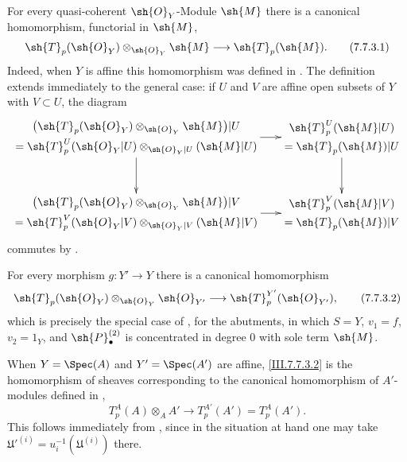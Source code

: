 \begin{env}[7.7.3]
\label{III.7.7.3}
For every quasi-coherent $\sh{O}_Y$-Module $\sh{M}$ there is
a canonical homomorphism, functorial in $\sh{M}$,
\[
  \sh{T}_p(\sh{O}_Y)
  \otimes_{\sh{O}_Y}\sh{M}
  \longrightarrow
  \sh{T}_p(\sh{M}).
  \tag{7.7.3.1}\label{III.7.7.3.1}
\]
Indeed, when $Y$ is affine this homomorphism was defined in
.  The definition extends immediately to
the general case: if $U$ and $V$ are affine open subsets of
$Y$ with $V\subset U$, the diagram
\[
\xymatrix@C=18pt@R=32pt{
  {\begin{gathered}
    \bigl(\sh{T}_p(\sh{O}_Y)
      \otimes_{\sh{O}_Y}\sh{M}\bigr)|U\\
    =
    \sh{T}^U_p(\sh{O}_Y|U)
      \otimes_{\sh{O}_Y|U}(\sh{M}|U)
  \end{gathered}}
  \ar[r]\ar[d]
  &
  {\begin{gathered}
    \sh{T}^U_p(\sh{M}|U)\\
    =\sh{T}_p(\sh{M})|U
  \end{gathered}}
  \ar[d]
  \\
  {\begin{gathered}
    \bigl(\sh{T}_p(\sh{O}_Y)
      \otimes_{\sh{O}_Y}\sh{M}\bigr)|V\\
    =
    \sh{T}^V_p(\sh{O}_Y|V)
      \otimes_{\sh{O}_Y|V}(\sh{M}|V)
  \end{gathered}}
  \ar[r]
  &
  {\begin{gathered}
    \sh{T}^V_p(\sh{M}|V)\\
    =\sh{T}_p(\sh{M})|V
  \end{gathered}}
}
\]
commutes by .

For every morphism $g:Y'\to Y$ there is a canonical
homomorphism
\[
  \sh{T}_p(\sh{O}_Y)
  \otimes_{\sh{O}_Y}\sh{O}_{Y'}
  \longrightarrow
  \sh{T}^{Y'}_p(\sh{O}_{Y'}),
  \tag{7.7.3.2}\label{III.7.7.3.2}
\]
which is precisely the special case of
, for the abutments, in which
$S=Y$, $v_1=f$, $v_2=1_Y$, and
$\sh{P}^{(2)}_\bullet$ is concentrated in degree $0$ with
sole term $\sh{M}$.

When $Y=\Spec(A)$ and $Y'=\Spec(A')$ are affine,
\eqref{III.7.7.3.2} is the homomorphism of sheaves
corresponding to the canonical homomorphism of $A'$-modules
defined in ,
\[
  T^A_p(A)\otimes_A A'
  \longrightarrow
  T^{A'}_p(A')
  =
  T^A_p(A').
\]
This follows immediately from , since in
the situation at hand one may take
$\mathfrak U'^{(i)}=u_i^{-1}(\mathfrak U^{(i)})$ there.
\end{env}

